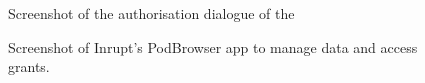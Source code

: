 \begin{figure}[htp]
    \caption[Screenshots of the authorisation dialogues of existing Solid servers.]{Screenshot of the authorisation dialogue of the}
    \label{fig:authorisation-dialogue}
    \centering
    \qquad
\end{figure}

\begin{figure}[htp]
    \centering
    \caption{Screenshot of Inrupt's PodBrowser app to manage data and access grants.}
    \label{fig:podbrowser}
\end{figure}

